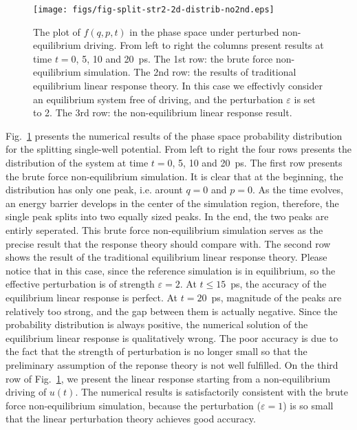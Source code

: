 \documentclass[]{tMPH2e}
\newcommand{\eps}{\varepsilon}
\begin{document}
\begin{figure}
  \centering
  \texttt{[image: figs/fig-split-str2-2d-distrib-no2nd.eps]}
  \caption{ The plot of $ f(q,p,t)$ in the phase
    space under perturbed non-equilibrium driving. From left to right the columns present results at time $t =
    0$, 5, 10 and 20~\textsf{ps}.  The 1st row: the brute force
    non-equilibrium simulation. The 2nd row: the results of
    traditional equilibrium linear response theory. In this case we
    effectivly consider an equilibrium system free of driving, and the perturbation $\eps$ is set to 2.  The 3rd row: the
    non-equilibrium linear response result.  }
  \label{fig:tmp6}
\end{figure}

Fig.~\ref{fig:tmp6} presents the numerical results of the phase space probability distribution for the splitting
single-well potential. From left to right the four rows presents the
distribution of the system at time $t = 0$, 5, 10 and 20~\textsf{ps}. The first
row presents the brute force non-equilibrium simulation.  It is clear
that at the beginning, the distribution has only one peak,
i.e. arount $q = 0$ and $p = 0$. As the time evolves, an energy barrier develops
in the center of the simulation region, therefore, the single peak
splits into two equally sized peaks.  In the end, the two
peaks are entirly seperated.  This brute force non-equilibrium
simulation serves as the precise result that the response theory
should compare with. The second row shows the result of the
traditional equilibrium linear response theory.  Please notice that in
this case, since the reference simulation is in equilibrium, so 
the effective perturbation is of strength $\eps = 2$.  At $t \leq
15$~\textsf{ps}, the accuracy of the equilibrium linear response is
perfect. At $t =
20$~\textsf{ps}, magnitude of the peaks are relatively too strong,
and the gap between them is actually negative.
Since the probability distribution is always positive, the
numerical solution of the equilibrium linear response is qualitatively wrong.
The poor accuracy is due to the fact that the strength of perturbation is no
longer small so that the preliminary assumption of the reponse theory
is not well fulfilled.  On the third row of Fig.~\ref{fig:tmp6},
we present the linear response starting from a non-equilibrium driving
of $u(t)$.  The numerical results is satisfactorily consistent with
the brute force non-equilibrium simulation, because the perturbation
($\eps = 1$) is so small that the linear perturbation theory achieves
good accuracy.
\end{document}
